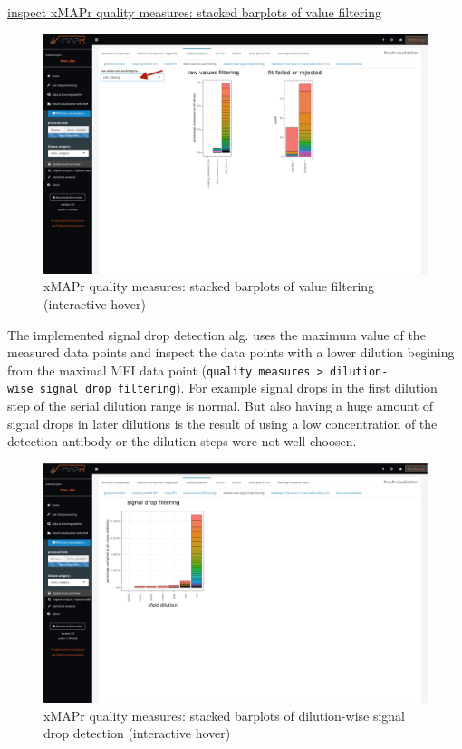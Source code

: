 \documentclass[
]{book}
\begin{document}
\href{figures/quality_measures__value_filtering.png}{inspect xMAPr quality measures: stacked barplots of value filtering}

\begin{figure}
\includegraphics[width=50.47in]{figures/quality_measures__value_filtering1} \caption{xMAPr quality measures: stacked barplots of value filtering (interactive hover)}\label{fig:BarplotsValueFiltering1}
\end{figure}

The implemented signal drop detection alg. uses the maximum value of the measured data points and inspect the data points with a lower dilution begining from the maximal MFI data point (\texttt{quality\ measures\ \textgreater{}\ dilution-wise\ signal\ drop\ filtering}). For example signal drops in the first dilution step of the serial dilution range is normal. But also having a huge amount of signal drops in later dilutions is the result of using a low concentration of the detection antibody or the dilution steps were not well choosen.

\begin{figure}
\includegraphics[width=50.5in]{figures/quality_measures__value_filtering_signal_drop} \caption{xMAPr quality measures: stacked barplots of dilution-wise signal drop detection (interactive hover)}\label{fig:BarplotsValueFiltering2}
\end{figure}
\end{document}
